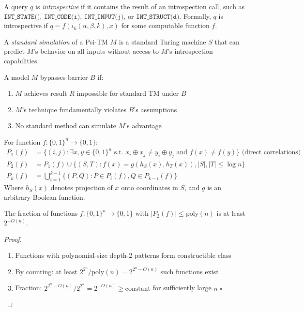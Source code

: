 \documentclass[11pt]{article}
\newcommand{\qed}{\hfill$\square$}
\begin{document}
\begin{definition}
A query $q$ is \textit{introspective} if it contains the result of an introspection call, such as $\texttt{INT\_STATE()}$, $\texttt{INT\_CODE(i)}$, $\texttt{INT\_INPUT(j)}$, or $\texttt{INT\_STRUCT(d)}$. Formally, $q$ is introspective if $q = f(\iota_k(\alpha, \beta, k), x)$ for some computable function $f$.
\end{definition}

\begin{definition}
A \textit{standard simulation} of a Psi-TM $M$ is a standard Turing machine $S$ that can predict $M$'s behavior on all inputs without access to $M$'s introspection capabilities.
\end{definition}

\begin{definition}
A model $M$ bypasses barrier $B$ if:
\begin{enumerate}
\item $M$ achieves result $R$ impossible for standard TM under $B$
\item $M$'s technique fundamentally violates $B$'s assumptions
\item No standard method can simulate $M$'s advantage
\end{enumerate}
\end{definition}

\begin{definition}
For function $f: \{0,1\}^n \to \{0,1\}$:
\begin{align}
P_1(f) &= \{(i,j) : \exists x,y \in \{0,1\}^n \text{ s.t. } x_i \oplus x_j \neq y_i \oplus y_j \text{ and } f(x) \neq f(y)\} \text{ (direct correlations)}\\
P_2(f) &= P_1(f) \cup \{(S,T) : f(x) = g(h_S(x), h_T(x)), |S|,|T| \leq \log n\}\\
P_k(f) &= \bigcup_{i=1}^{k-1} \{(P,Q) : P \in P_i(f), Q \in P_{k-i}(f)\}
\end{align}
Where $h_S(x)$ denotes projection of $x$ onto coordinates in $S$, and $g$ is an arbitrary Boolean function.
\end{definition}

\begin{theorem}
The fraction of functions $f: \{0,1\}^n \to \{0,1\}$ with $|P_2(f)| \leq \text{poly}(n)$ is at least $2^{-O(n)}$.
\end{theorem}
\begin{proof}
\begin{enumerate}
\item Functions with polynomial-size depth-2 patterns form constructible class
\item By counting: at least $2^{2^n}/\text{poly}(n) = 2^{2^n - O(n)}$ such functions exist
\item Fraction: $2^{2^n - O(n)}/2^{2^n} = 2^{-O(n)} \geq \text{constant}$ for sufficiently large $n$ \qed
\end{enumerate}
\end{proof}
\end{document}
